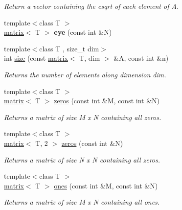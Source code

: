 \begin{DoxyCompactItemize}
\begin{DoxyCompactList}\small\item\em Return a vector containing the csqrt of each element of A. \end{DoxyCompactList}\item 
\hypertarget{namespacekeycpp_a8ae33fb19a521ab1ec1f22e7c39ca076}{{\footnotesize template$<$class T $>$ }\\\hyperlink{classkeycpp_1_1matrix}{matrix}$<$ T $>$ {\bfseries eye} (const int \&N)}\label{namespacekeycpp_a8ae33fb19a521ab1ec1f22e7c39ca076}

\item 
{\footnotesize template$<$class T , size\-\_\-t dim$>$ }\\int \hyperlink{namespacekeycpp_a737223780bc4bcda96ca2142a2ac3de9}{size} (const \hyperlink{classkeycpp_1_1matrix}{matrix}$<$ T, dim $>$ \&A, const int \&n)
\begin{DoxyCompactList}\small\item\em Returns the number of elements along dimension dim. \end{DoxyCompactList}\item 
{\footnotesize template$<$class T $>$ }\\\hyperlink{classkeycpp_1_1matrix}{matrix}$<$ T $>$ \hyperlink{namespacekeycpp_a5699c522088657287bf0ac01173b716c}{zeros} (const int \&M, const int \&N)
\begin{DoxyCompactList}\small\item\em Returns a matrix of size M x N containing all zeros. \end{DoxyCompactList}\item 
{\footnotesize template$<$class T $>$ }\\\hyperlink{classkeycpp_1_1matrix}{matrix}$<$ T, 2 $>$ \hyperlink{namespacekeycpp_a3f2d2688097884d279a27fdbb38d35b6}{zeros} (const int \&N)
\begin{DoxyCompactList}\small\item\em Returns a matrix of size N x N containing all zeros. \end{DoxyCompactList}\item 
{\footnotesize template$<$class T $>$ }\\\hyperlink{classkeycpp_1_1matrix}{matrix}$<$ T $>$ \hyperlink{namespacekeycpp_a388f91a0ccf34978ef9403ccd0c680bf}{ones} (const int \&M, const int \&N)
\begin{DoxyCompactList}\small\item\em Returns a matrix of size M x N containing all ones. \end{DoxyCompactList}\item 

\end{DoxyCompactItemize}
